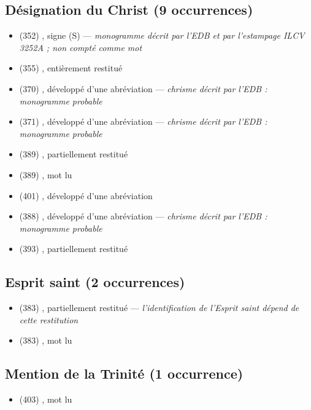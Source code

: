 \subsection*{Désignation du Christ (9 occurrences)}
\begin{itemize}[leftmargin=1.2em,itemsep=0pt]
\item {} (352) , signe (S) — \textit{monogramme décrit par l’EDB et par l’estampage ILCV 3252A ; non compté comme mot}
\item {} (355) , entièrement restitué
\item {} (370) , développé d’une abréviation — \textit{chrisme décrit par l’EDB : monogramme probable}
\item {} (371) , développé d’une abréviation — \textit{chrisme décrit par l’EDB : monogramme probable}
\item {} (389) , partiellement restitué
\item {} (389) , mot lu
\item {} (401) , développé d’une abréviation
\item {} (388) , développé d’une abréviation — \textit{chrisme décrit par l’EDB : monogramme probable}
\item {} (393) , partiellement restitué
\end{itemize}
\subsection*{Esprit saint (2 occurrences)}
\begin{itemize}[leftmargin=1.2em,itemsep=0pt]
\item {} (383) , partiellement restitué — \textit{l’identification de l’Esprit saint dépend de cette restitution}
\item {} (383) , mot lu
\end{itemize}
\subsection*{Mention de la Trinité (1 occurrence)}
\begin{itemize}[leftmargin=1.2em,itemsep=0pt]
\item {} (403) , mot lu
\end{itemize}
